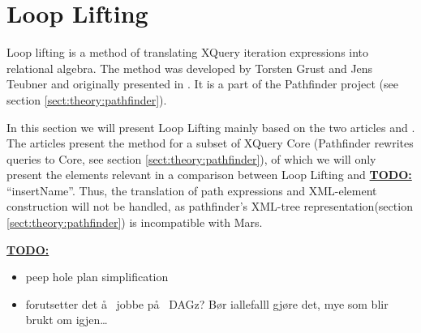 \section{Loop Lifting}
\label{sect:translation:loop_lifting}
Loop lifting is a method of translating XQuery iteration expressions into relational algebra. The method was
developed by Torsten Grust and Jens Teubner and originally presented in \cite{pathfinder_mothertongue}. It is a
part of the Pathfinder project\cite{pathfinderHome} (see section \ref{sect:theory:pathfinder}).

In this section we will present Loop Lifting mainly based on the two articles \cite{pathfinder_mothertongue} and
\cite{pathfinder_purelyRelational}. The articles present the method for a subset of XQuery Core (Pathfinder
rewrites queries to Core, see section \ref{sect:theory:pathfinder}), of which we will only present the elements
relevant in a comparison between Loop Lifting and \underline{\textbf{\Large TODO:}} ``insertName''. Thus, the
translation of path expressions and XML-element construction will not be handled, as pathfinder's XML-tree
representation(section \ref{sect:theory:pathfinder}) is incompatible with Mars.

\underline{\textbf{\Large TODO:}}
\begin{itemize}
  \item peep hole plan simplification
  \item forutsetter det \aa~ jobbe p\aa~ DAGz? B\o r iallefalll gj\o re det, mye som blir brukt om igjen\ldots
\end{itemize}

